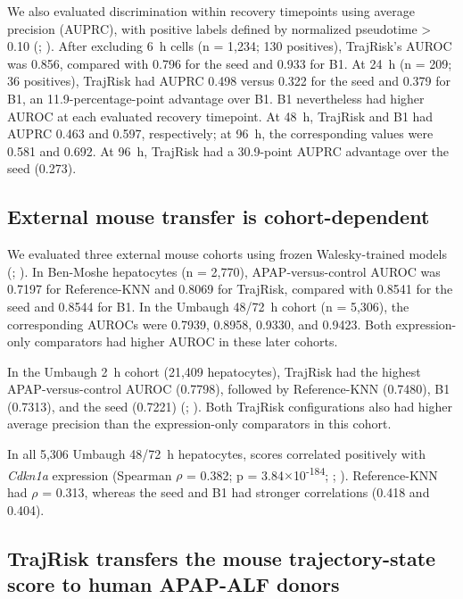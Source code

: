 We also evaluated discrimination within recovery timepoints using average precision (AUPRC), with positive labels defined by normalized pseudotime > 0.10 (; ). After excluding 6~h cells (n = 1,234; 130 positives), TrajRisk's AUROC was 0.856, compared with 0.796 for the seed and 0.933 for B1. At 24~h (n = 209; 36 positives), TrajRisk had AUPRC 0.498 versus 0.322 for the seed and 0.379 for B1, an 11.9-percentage-point advantage over B1. B1 nevertheless had higher AUROC at each evaluated recovery timepoint. At 48~h, TrajRisk and B1 had AUPRC 0.463 and 0.597, respectively; at 96~h, the corresponding values were 0.581 and 0.692. At 96~h, TrajRisk had a 30.9-point AUPRC advantage over the seed (0.273).


\subsection*{External mouse transfer is cohort-dependent}

We evaluated three external mouse cohorts using frozen Walesky-trained models (; ). In Ben-Moshe hepatocytes (n = 2,770), APAP-versus-control AUROC was 0.7197 for Reference-KNN and 0.8069 for \SelfOnly{} TrajRisk, compared with 0.8541 for the seed and 0.8544 for B1. In the Umbaugh 48/72~h cohort (n = 5,306), the corresponding AUROCs were 0.7939, 0.8958, 0.9330, and 0.9423. Both expression-only comparators had higher AUROC in these later cohorts.

In the Umbaugh 2~h cohort (21,409 hepatocytes), \SelfOnly{} TrajRisk had the highest APAP-versus-control AUROC (0.7798), followed by Reference-KNN (0.7480), B1 (0.7313), and the seed (0.7221) (; ). Both TrajRisk configurations also had higher average precision than the expression-only comparators in this cohort.

In all 5,306 Umbaugh 48/72~h hepatocytes, \SelfOnly{} scores correlated positively with \textit{Cdkn1a} expression (Spearman \ensuremath{\rho} = 0.382; p = 3.84\ensuremath{\times}10\textsuperscript{-184}; ; ). Reference-KNN had \ensuremath{\rho} = 0.313, whereas the seed and B1 had stronger correlations (0.418 and 0.404).


\subsection*{TrajRisk transfers the mouse trajectory-state score to human APAP-ALF donors}

